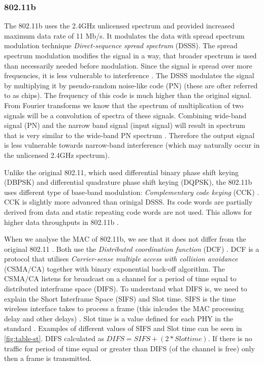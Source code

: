 \subsubsection{802.11b}
% 
The 802.11b uses the 2.4GHz unlicensed spectrum and provided increased maximum data rate of 11 Mb/s. It  modulates the data with spread spectrum modulation technique \emph{Direct-sequence spread spectrum} (DSSS). The spread spectrum modulation modifies the signal in a way, that broader spectrum is used than necessarily needed before modulation. Since the signal is spread over more frequencies, it is less vulnerable to interference \cite{MaximIntegratedProductsInc.2013AnMaxim}. The DSSS modulates the signal by multiplying it by pseudo-random  noise-like code (PN) (these are ofter referred to as chips). The frequency of this code is much higher than the original signal. From Fourier transforms we know that the spectrum of multiplication of two signals will be a convolution of spectra of these signals. Combining wide-band signal (PN) and the narrow band signal (input signal) will result in spectrum that is very similar to the wide-band PN spectrum \cite{Haykin2001CommunicationSystems}. Therefore the output signal is less vulnerable towards narrow-band interference (which may naturally occur in the unlicensed 2.4GHz spectrum).\par
% 
Unlike the original 802.11, which used differential binary phase shift keying (DBPSK) and differential quadrature phase shift keying (DQPSK), the 802.11b uses different type of base-band modulation: \emph{Complementary code keying} (CCK) \cite{2016IEEEAccess.} \cite{Aboul-Magd2008WirelessPerspective}.
CCK is slightly more advanced than orinigal DSSS. Its code words are partially derived from data and static repeating code words are not used. This allows for higher data throughputs in 802.11b \cite{Gast2002802.11Guide}.\par
% 
When we analyse the MAC of 802.11b, we see that it does not differ from the original 802.11 \cite{Gast2002802.11Guide}. Both use the \emph{Distributed coordination function} (DCF) \cite{Hiertz2010TheUniverse}. DCF is a protocol that utilises \emph{Carrier-sense multiple access with collision avoidance} (CSMA/CA) together with binary exponential back-off algorithm. The CSMA/CA listens for broadcast on a channel for a period of time equal to distributed interframe space (DIFS). To understand what DIFS is, we need to explain the Short Interframe Space (SIFS) and Slot time. SIFS is the time wireless interface takes to process a frame (this inlcudes the MAC processing delay and other delays) \cite{2016IEEEAccess.}. Slot time is a value defined for each PHY in the standard \cite{2016IEEEAccess.}. Examples of different values of SIFS and Slot time can be seen in \ref{fig:table-st}. DIFS calculated as \(DIFS = SIFS + ( 2 * Slot time)\). If there is no traffic for period of time equal or greater than DIFS (of the channel is free) only then a frame is transmitted.\par
